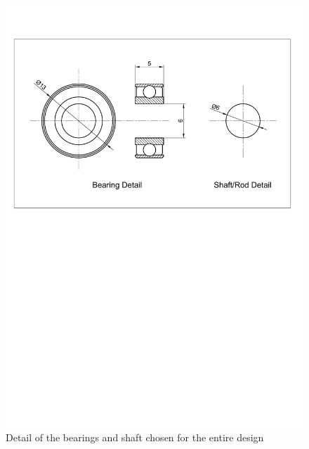         \begin{figure}[H]
          \centering
          \includegraphics[clip, trim=2cm 16cm 2cm 3cm, width=0.7\linewidth]{figures/bearing-shaft-detail}
          \caption[Detail of the bearings and shaft chosen for the entire design]{Detail of the bearings and shaft chosen for the entire design}
          \label{fig:mechDesign-bearingShaftDetail}
        \end{figure}        
        
